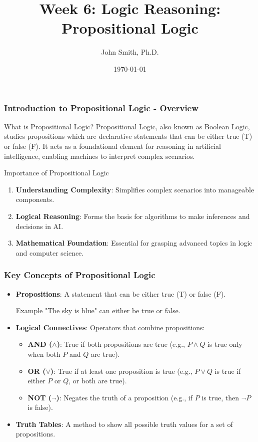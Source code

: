 \documentclass[aspectratio=169]{beamer}
\title[Week 6: Logic Reasoning]{Week 6: Logic Reasoning: Propositional Logic}
\author[J. Smith]{John Smith, Ph.D.}
\institute[University Name]{
  Department of Computer Science\\
  University Name\\
  \vspace{0.3cm}
  Email: email@university.edu\\
  Website: www.university.edu
}
\date{\today}
\begin{document}
\frame{\titlepage}

\begin{frame}[fragile]
    \titlepage
\end{frame}

\begin{frame}[fragile]
    \frametitle{Introduction to Propositional Logic - Overview}
    \begin{block}{What is Propositional Logic?}
        Propositional Logic, also known as Boolean Logic, studies propositions which are declarative statements that can be either true (T) or false (F). It acts as a foundational element for reasoning in artificial intelligence, enabling machines to interpret complex scenarios.
    \end{block}
    
    \begin{block}{Importance of Propositional Logic}
        \begin{enumerate}
            \item \textbf{Understanding Complexity}: Simplifies complex scenarios into manageable components.
            \item \textbf{Logical Reasoning}: Forms the basis for algorithms to make inferences and decisions in AI.
            \item \textbf{Mathematical Foundation}: Essential for grasping advanced topics in logic and computer science.
        \end{enumerate}
    \end{block}
\end{frame}

\begin{frame}[fragile]
    \frametitle{Key Concepts of Propositional Logic}
    \begin{itemize}
        \item \textbf{Propositions}: A statement that can be either true (T) or false (F). 
        \begin{block}{Example}
            "The sky is blue" can either be true or false.
        \end{block}
        
        \item \textbf{Logical Connectives}: Operators that combine propositions:
        \begin{itemize}
            \item \textbf{AND ($\land$)}: True if both propositions are true (e.g., $P \land Q$ is true only when both $P$ and $Q$ are true).
            \item \textbf{OR ($\lor$)}: True if at least one proposition is true (e.g., $P \lor Q$ is true if either $P$ or $Q$, or both are true).
            \item \textbf{NOT ($\neg$)}: Negates the truth of a proposition (e.g., if $P$ is true, then $\neg P$ is false).
        \end{itemize}
        
        \item \textbf{Truth Tables}: A method to show all possible truth values for a set of propositions.
    \end{itemize}
\end{frame}
\end{document}

